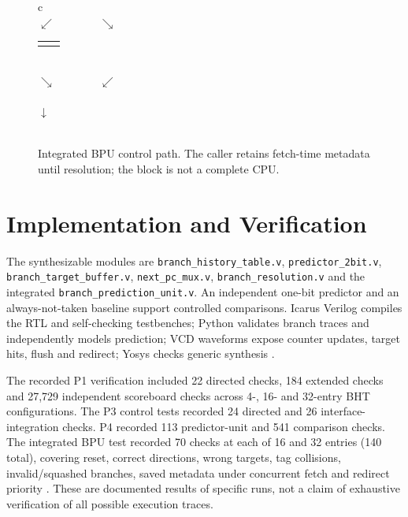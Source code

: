\documentclass[conference,a4paper]{IEEEtran}
\begin{document}
\begin{figure}[t]
\centering
\setlength{\fboxsep}{4pt}
\begin{tabular}{c}
\\[3pt]
$\swarrow\qquad\qquad\searrow$\\[-1pt]
\begin{tabular}{cc}
\fbox{\parbox{0.35\columnwidth}{\centering Two-bit BHT\\Direction}} &
\fbox{\parbox{0.35\columnwidth}{\centering Tagged BTB\\Target/hit}}
\end{tabular}\\[3pt]
$\searrow\qquad\qquad\swarrow$\\[-1pt]
\\[3pt]
$\downarrow$\\[-1pt]
\\
\end{tabular}
\caption{Integrated BPU control path. The caller retains fetch-time metadata until resolution; the block is not a complete CPU.}
\label{fig:architecture}
\end{figure}

\section{Implementation and Verification}
The synthesizable modules are \texttt{branch\_history\_table.v}, \texttt{predictor\_2bit.v}, \texttt{branch\_target\_buffer.v}, \texttt{next\_pc\_mux.v}, \texttt{branch\_resolution.v} and the integrated \texttt{branch\_prediction\_unit.v}. An independent one-bit predictor and an always-not-taken baseline support controlled comparisons. Icarus Verilog compiles the RTL and self-checking testbenches; Python validates branch traces and independently models prediction; VCD waveforms expose counter updates, target hits, flush and redirect; Yosys checks generic synthesis \cite{repo}.

The recorded P1 verification included 22 directed checks, 184 extended checks and 27,729 independent scoreboard checks across 4-, 16- and 32-entry BHT configurations. The P3 control tests recorded 24 directed and 26 interface-integration checks. P4 recorded 113 predictor-unit and 541 comparison checks. The integrated BPU test recorded 70 checks at each of 16 and 32 entries (140 total), covering reset, correct directions, wrong targets, tag collisions, invalid/squashed branches, saved metadata under concurrent fetch and redirect priority \cite{repo}. These are documented results of specific runs, not a claim of exhaustive verification of all possible execution traces.
\end{document}
